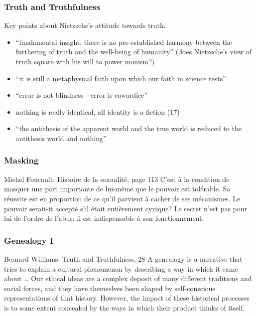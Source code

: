 \documentclass[xcolor=dvipsnames]{beamer}
\begin{document}
\begin{frame}
  \frametitle{Truth and Truthfulness}
  Key points about Nietzsche's attitude towards truth.
  \begin{itemize}
  \item ``fundamental insight: there is no pre-established harmony
    between the furthering of truth and the well-being of humanity''
    (does Nietzsche's view of truth square with his will to power
    monism?)
  \item ``it is still a metaphysical faith upon which our faith in
    science rests''
  \item ``error is not blindness---error is cowardice''
  \item nothing is really identical, all identity is a fiction (17)
  \item ``the antithesis of the apparent world and the true world is
    reduced to the antithesis world and nothing''
  \end{itemize}
\end{frame}

\begin{frame}
  \frametitle{Masking}
  \begin{block}{Michel Foucault: Histoire de la sexualit{\'e},
      page 113}
    C'est {\`a} la condition de masquer une part importante de
    lui-m{\^e}me que le pouvoir est tol{\'e}rable. Sa r{\'e}ussite
    est en proportion de ce qu'il parvient {\`a} cacher de ses
    m{\'e}canismes. Le pouvoir serait-it accept{\'e} s'il
    {\'e}tait enti{\`e}rement cynique? Le secret n'est pas pour
    lui de l'ordre de l'abus: il est indispensable {\`a} son
    fonctionnement.
  \end{block}
\end{frame}

\begin{frame}
  \frametitle{Genealogy I}
  \begin{block}{Bernard Williams: Truth and Truthfulness, 28}
  A genealogy is a narrative that tries to explain a cultural
  phenomenon by describing a way in which it came about {\ldots} Our
  ethical ideas are a complex deposit of many different traditions and
  social forces, and they have themselves been shaped by
  self-conscious representations of that history. However, the impact
  of these historical processes is to some extent concealed by the
  ways in which their product thinks of itself.
  \end{block}
\end{frame}
\end{document}
